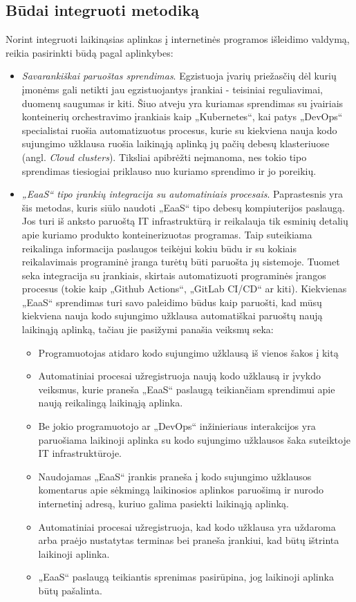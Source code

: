 \documentclass{VUMIFPSkursinis}
\begin{document}
\subsection{Būdai integruoti metodiką}

Norint integruoti laikinąsias aplinkas į internetinės programos išleidimo valdymą, reikia pasirinkti būdą pagal aplinkybes:

\begin{itemize}
  \item \textit{Savarankiškai paruoštas sprendimas}. Egzistuoja įvarių priežasčių dėl kurių įmonėms gali netikti jau egzistuojantys įrankiai - teisiniai reguliavimai, duomenų saugumas ir kiti. Šiuo atveju yra kuriamas sprendimas su įvairiais konteinerių orchestravimo įrankiais kaip „Kubernetes“, kai patys „DevOps“ specialistai ruošia automatizuotus procesus, kurie su kiekviena nauja kodo sujungimo užklausa ruošia laikinąją aplinką jų pačių debesų klasteriuose (angl. \textit{Cloud clusters}). Tiksliai apibrėžti neįmanoma, nes tokio tipo sprendimas tiesiogiai priklauso nuo kuriamo sprendimo ir jo poreikių.

  \item \textit{„EaaS“ tipo įrankių integracija su automatiniais procesais}. Paprastesnis yra šis metodas, kuris siūlo naudoti „EaaS“ tipo debesų kompiuterijos paslaugą. Jos turi iš anksto paruoštą IT infrastruktūrą ir reikalauja tik esminių detalių apie kuriamo produkto konteinerizuotas programas. Taip suteikiama reikalinga informacija paslaugos teikėjui kokiu būdu ir su kokiais reikalavimais programinė įranga turėtų būti paruošta jų sistemoje. Tuomet seka integracija su įrankiais, skirtais automatizuoti programinės įrangos procesus (tokie kaip „Github Actions“, „GitLab CI/CD“ ar kiti). Kiekvienas „EaaS“ sprendimas turi savo paleidimo būdus kaip paruošti, kad mūsų kiekviena nauja kodo sujungimo užklausa automatiškai paruoštų naują laikinąją aplinką, tačiau jie pasižymi panašia veiksmų seka:

    \begin{itemize}
      \item Programuotojas atidaro kodo sujungimo užklausą iš vienos šakos į kitą
      \item Automatiniai procesai užregistruoja naują kodo užklausą ir įvykdo veiksmus, kurie praneša „EaaS“ paslaugą teikiančiam sprendimui apie naują reikalingą laikinąją aplinka.
      \item Be jokio programuotojo ar „DevOps“ inžinieriaus interakcijos yra paruošiama laikinoji aplinka su kodo sujungimo užklausos šaka suteiktoje IT infrastruktūroje.
      \item Naudojamas „EaaS“ įrankis praneša į kodo sujungimo užklausos komentarus apie sėkmingą laikinosios aplinkos paruošimą ir nurodo internetinį adresą, kuriuo galima pasiekti laikinąją aplinką.
      \item Automatiniai procesai užregistruoja, kad kodo užklausa yra uždaroma arba praėjo nustatytas terminas bei praneša įrankiui, kad būtų ištrinta laikinoji aplinka.
      \item „EaaS“ paslaugą teikiantis sprenimas pasirūpina, jog laikinoji aplinka būtų pašalinta.
    \end{itemize}


\end{itemize}
\end{document}
